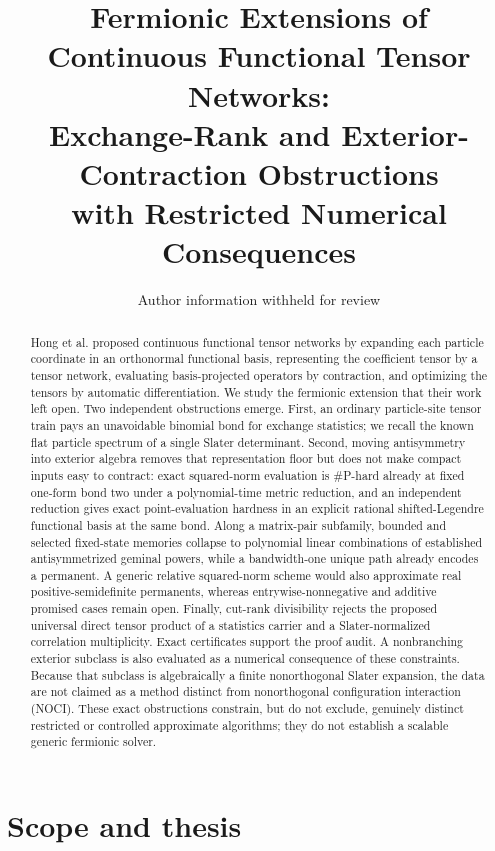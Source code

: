 \documentclass[11pt]{article}
\title{Fermionic Extensions of Continuous Functional Tensor Networks:\\
Exchange-Rank and Exterior-Contraction Obstructions\\
with Restricted Numerical Consequences}
\author{Author information withheld for review}
\date{}
\theoremstyle{definition}
\begin{document}
\maketitle

\begin{abstract}
Hong et al. proposed continuous functional tensor networks by expanding each
particle coordinate in an orthonormal functional basis, representing the
coefficient tensor by a tensor network, evaluating basis-projected operators
by contraction, and optimizing the tensors by automatic differentiation.  We
study the fermionic extension that their work left open.  Two independent
obstructions emerge.  First, an ordinary particle-site tensor train pays an
unavoidable binomial bond for exchange statistics; we recall the known flat
particle spectrum of a single Slater determinant.  Second, moving
antisymmetry into exterior algebra
removes that representation floor but does not make compact inputs easy to
contract: exact squared-norm evaluation is \#P-hard already at fixed one-form
bond two under a polynomial-time metric reduction, and an independent
reduction gives exact point-evaluation hardness in an explicit rational
shifted-Legendre functional basis at the same bond.  Along a matrix-pair
subfamily, bounded and selected fixed-state memories collapse to polynomial
linear combinations of established antisymmetrized geminal powers, while a
bandwidth-one unique path already encodes a permanent.  A generic relative
squared-norm scheme would also approximate real positive-semidefinite
permanents, whereas entrywise-nonnegative and additive promised cases remain
open.  Finally, cut-rank divisibility rejects the proposed universal direct
tensor product of a statistics carrier and a Slater-normalized correlation
multiplicity.  Exact certificates support the proof audit.  A nonbranching exterior subclass is
also
evaluated as a numerical consequence of these constraints.  Because that
subclass is algebraically a finite nonorthogonal Slater expansion, the data are
not claimed as a method distinct from nonorthogonal configuration interaction
(NOCI).  These exact obstructions constrain, but do not exclude, genuinely
distinct restricted or controlled approximate algorithms; they do not
establish a scalable generic fermionic solver.
\end{abstract}

\section{Scope and thesis}
\end{document}
